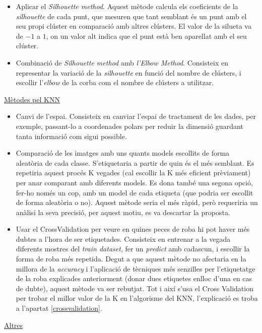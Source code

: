 \documentclass[a4paper, 11pt]{article}
\begin{document}
\begin{itemize}
    \item Aplicar el \textit{Silhouette method}. Aquest mètode calcula els coeficients de la \textit{silhouette} de cada punt, que mesuren que tant semblant és un punt amb el seu propi clúster en comparació amb altres clústers. El valor de la silueta va de $-1$ a $1$, on un valor alt indica que el punt està ben aparellat amb el seu clúster.
    \item Combinació de \textit{Silhouette method} amb \textit{l'Elbow Method}. Consisteix en representar la variació de la \textit{silhouette} en funció del nombre de clústers, i escollir l’\textit{elbow} de la corba com el nombre de clústers a utilitzar.
 
\end{itemize}
\underline{Mètodes pel KNN}\\
\begin{itemize}
    \item Canvi de l'espai. Consisteix en canviar l'espai de tractament de les dades, per exemple, passant-lo a coordenades polars per reduir la dimensió guardant tanta informació com sigui possible.
    \item Comparació de les imatges amb uns quants models escollits de forma aleatòria de cada classe. S’etiquetaria a partir de quin és el més semblant. Es repetiria aquest procés K vegades (cal escollir la K més eficient prèviament) per anar comparant amb diferents models. Es dona també una segona opció, fer-ho només un cop, amb un model de cada etiqueta (que podria ser escollit de forma aleatòria o no). Aquest mètode seria el més ràpid, però requeriria un anàlisi la seva precisió, per aquest motiu, es va descartar la proposta.
    \item Usar el CrossValidation per veure en quines peces de roba hi pot haver més dubtes a l'hora de ser etiquetades. Consisteix en entrenar a la vegada diferents mostres del \textit{train dataset}, fer un \textit{predict} amb cadascun, i escollir la forma de roba més repetida. Degut a que aquest mètode no afectaria en la millora de la \textit{accuracy} i l'aplicació de tècniques més senzilles per l'etiquetatge de la roba explicades anteriorment (donar dues etiquetes enlloc d'una en cas de dubte), aquest mètode va ser rebutjat. Tot i així s'usa el Cross Validation per trobar el millor valor de la K en l'algorisme del KNN, l'explicació es troba a l'apartat \textcolor{blue}{\ref{crossvalidation}}.
\end{itemize}
\underline{Altres}
\end{document}
